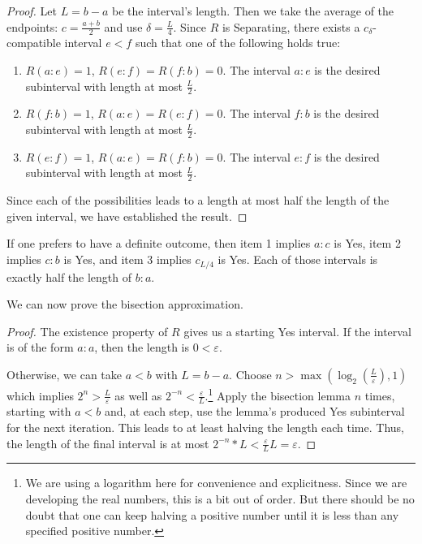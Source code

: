 \documentclass[12pt]{article}
\begin{document}
\begin{proof}
 Let $L = b-a$ be the interval's length. Then we take the average of the endpoints: $c = \frac{a+b}{2}$ and use $\delta = \frac{L}{4}$. Since $R$ is Separating, there exists a $c_{\delta}$-compatible interval $e \lt f$ such that one of the following holds true:
\begin{enumerate}
    \item $R(a:e)=1$, $R(e:f) = R(f:b) = 0$. The interval $a:e$ is the desired subinterval with length at most $\frac{L}{2}$.
    \item $R(f:b)=1$, $R(a:e) = R(e:f) = 0$. The interval $f:b$ is the desired subinterval with length at most $\frac{L}{2}$.
    \item $R(e:f)=1$, $R(a:e) = R(f:b) = 0$. The interval $e:f$ is the desired subinterval with length at most $\frac{L}{2}$.
\end{enumerate}
Since each of the possibilities leads to a length at most half the length of the given interval, we have established the result. 
    \end{proof}

If one prefers to have a definite outcome, then item 1 implies $a:c$ is Yes, item 2 implies $c:b$ is Yes, and item 3 implies $c_{L/4}$ is Yes. Each of those intervals is exactly half the length of $b:a$.

We can now prove the bisection approximation. 

\begin{proof}
    The existence property of $R$ gives us a starting Yes interval. If the interval is of the form $a:a$, then the length is $0 < \varepsilon$.
    
    Otherwise, we can take $a \lt b$ with $L = b-a$. Choose $n > \max(\log_2 (\frac{L}{\varepsilon}), 1)$ which implies $2^n > \frac{L}{\varepsilon}$ as well as $2^{-n} < \frac{\varepsilon}{L}$.\footnote{We are using a logarithm here for convenience and explicitness. Since we are developing the real numbers, this is a bit out of order. But there should be no doubt that one can keep halving a positive number until it is less than any specified positive number.} Apply the bisection lemma $n$ times, starting with $a \lt b$ and, at each step, use the lemma's produced Yes subinterval for the next iteration. This leads to at least halving the length each time. Thus, the length of the final interval is at most $2^{-n} * L < \frac{\varepsilon}{L} L = \varepsilon$.

\end{proof}
\end{document}
